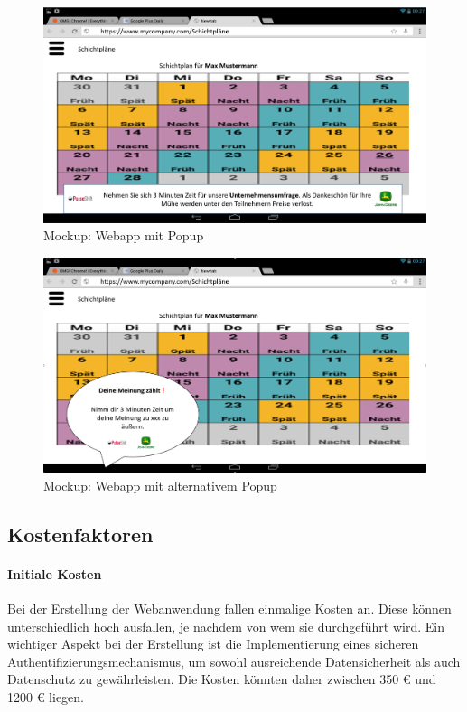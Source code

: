 \begin{figure}[H] 
\centering 
\includegraphics[scale=0.3]{images/lunchapp_mockups/mockup3} 
\caption[Mockup: Webapp mit Popup]{Mockup: Webapp mit Popup} 
\label{wamu2} 
\end{figure}

\begin{figure}[H] 
\centering 
\includegraphics[scale=0.3]{images/lunchapp_mockups/mockup2} 
\caption[Mockup: Webapp mit alternativem Popup]{Mockup: Webapp mit alternativem Popup} 
\label{wamu3} 
\end{figure}



\subsection{Kostenfaktoren}

\paragraph{Initiale Kosten}
Bei der Erstellung der Webanwendung fallen einmalige Kosten an. Diese können unterschiedlich hoch ausfallen, je nachdem von wem sie durchgeführt wird. Ein wichtiger Aspekt bei der Erstellung ist die Implementierung eines sicheren Authentifizierungsmechanismus, um sowohl ausreichende Datensicherheit als auch Datenschutz zu gewährleisten. Die Kosten könnten daher zwischen 350 € und 1200 € liegen.

